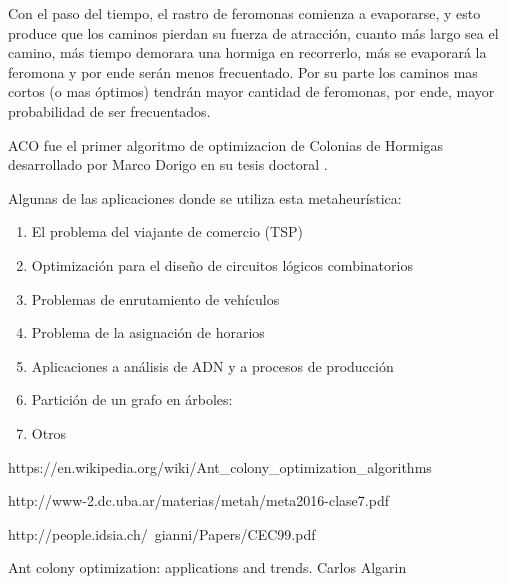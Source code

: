 Con el paso del tiempo, el rastro de feromonas comienza a evaporarse, y esto produce que los caminos pierdan su fuerza de atracción, cuanto más largo sea el camino, más tiempo demorara una hormiga en recorrerlo, más se evaporará la feromona y por ende serán menos frecuentado. Por su parte los caminos mas cortos (o mas óptimos) tendrán mayor cantidad de feromonas, por ende, mayor probabilidad de ser frecuentados.

ACO fue el primer algoritmo de optimizacion de Colonias de Hormigas desarrollado por Marco Dorigo en su tesis doctoral \cite{paperDorigo}. 

Algunas de las aplicaciones donde se utiliza esta metaheurística:
\begin{enumerate}
\item El problema del viajante de comercio (TSP)
\item Optimización para el diseño de circuitos lógicos combinatorios
\item Problemas de enrutamiento de vehículos
\item Problema de la asignación de horarios
\item Aplicaciones a análisis de ADN y a procesos de producción
\item Partición de un grafo en árboles:
\item Otros
\end{enumerate}



\begin{thebibliography}{9}
https://en.wikipedia.org/wiki/Ant\_colony\_optimization\_algorithms

http://www-2.dc.uba.ar/materias/metah/meta2016-clase7.pdf

 
http://people.idsia.ch/~gianni/Papers/CEC99.pdf

Ant colony optimization: applications and trends. Carlos Algarin

\end{thebibliography}